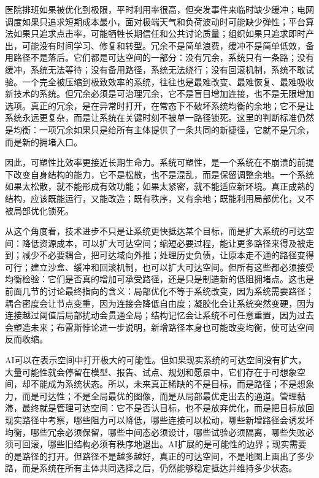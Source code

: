 医院排班如果被优化到极限，平时利用率很高，但突发事件来临时缺少缓冲；电网调度如果只追求短期成本最小，面对极端天气和负荷波动时可能缺少弹性；平台算法如果只追求点击率，可能牺牲长期信任和公共讨论质量；组织如果只追求即时产出，可能没有时间学习、修复和转型。冗余不是简单浪费，缓冲不是简单低效，备用路径不是落后。它们都是可达空间的一部分：没有冗余，系统只有一条路；没有缓冲，系统无法等待；没有备用路径，系统无法绕行；没有回滚机制，系统不敢试验。一个完全被压缩到极致效率的系统，往往也是最难改变、最难恢复、最难吸收新技术的系统。但冗余必须是可治理冗余，它不是盲目增加连接，也不是无限增加选项。真正的冗余，是在异常时打开，在常态下不破坏系统均衡的余地；它不是让系统永远更复杂，而是让系统在关键时刻不被单一路径锁死。这里的判断标准仍然是均衡：一项冗余如果只是给所有主体提供了一条共同的新捷径，它就不是冗余，而是新的拥堵入口。


因此，可塑性比效率更接近长期生命力。系统可塑性，是一个系统在不崩溃的前提下改变自身结构的能力，它不是松散，也不是混乱，而是保留调整余地。一个系统如果太松散，就不能形成有效功能；如果太紧密，就不能适应新环境。真正成熟的结构，应该既能运行，又能改造；既有秩序，又有余地；既能利用局部优化，又不被局部优化锁死。

从这个角度看，技术进步不只是让系统更快抵达某个目标，而是扩大系统的可达空间：降低资源成本，可以扩大可达空间；缩短必要过程，能让更多路径来得及被走到；减少不必要耦合，把可达域向外推；处理历史负债，让原本走不通的路径变得可行；建立沙盒、缓冲和回滚机制，也可以扩大可达空间。但所有这些都必须接受均衡检验：它们是否真的增加可承受路径，还是只是制造新的低阻拥堵点。这也是前面几节的讨论最终指向的含义：局部优化不等于系统改变，因为系统需要路径；耦合密度会让节点变重，因为连接会降低自由度；凝胶化会让系统突然变硬，因为连接越过阈值后局部扰动会贯通全局；结构记忆会让系统不可任意重置，因为过去会塑造未来；布雷斯悖论进一步说明，新增路径本身也可能改变均衡，使可达空间反而收缩。

AI可以在表示空间中打开极大的可能性。但如果现实系统的可达空间没有扩大，大量可能性就会停留在模型、报告、试点、规划和愿景中，它们存在于可想象空间，却不能成为系统状态。所以，未来真正稀缺的不是目标，而是路径；不是想象力，而是可达性；不是全局最优的图像，而是从局部最优走出去的通道。管理黏滞，最终就是管理可达空间：它不是否认目标，也不是放弃优化，而是把目标放回现实路径中考察，哪些阻力可以降低，哪些连接可以松动，哪些新增路径会诱发坏均衡，哪些冗余必须保留，哪些中间态必须设计，哪些试验必须隔离，哪些失败必须可回滚，哪些旧结构必须有秩序地退出。AI扩展的是可能性的边界；现实需要的是路径的打开。但路径不是越多越好，真正的可达空间，不是地图上画出了多少路，而是系统在所有主体共同选择之后，仍然能够稳定抵达并维持多少状态。

